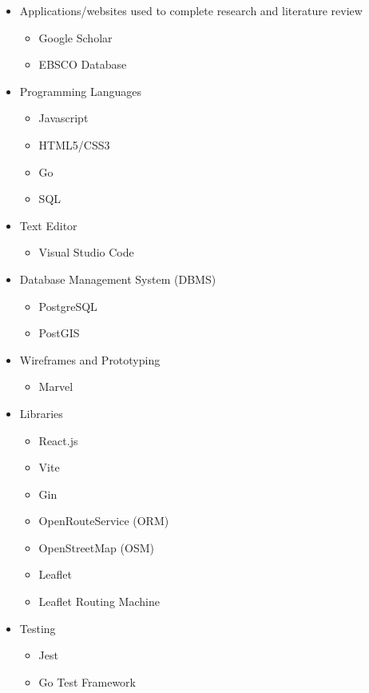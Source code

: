 \begin{itemize}
    \item Applications/websites used to complete research and literature review
    \begin{itemize}
        \item Google Scholar
        \item EBSCO Database
    \end{itemize}
    \item Programming Languages
    \begin{itemize}
        \item Javascript
        \item HTML5/CSS3
        \item Go
        \item SQL
    \end{itemize}
    \item Text Editor
    \begin{itemize}
        \item Visual Studio Code
    \end{itemize}
    \item Database Management System (DBMS)
    \begin{itemize}
        \item PostgreSQL
        \item PostGIS
    \end{itemize}
    \item Wireframes and Prototyping
    \begin{itemize}
        \item Marvel
    \end{itemize}
    \item Libraries
    \begin{itemize}
        \item React.js
        \item Vite
        \item Gin
        \item OpenRouteService (ORM)
        \item OpenStreetMap (OSM)
        \item Leaflet
        \item Leaflet Routing Machine
    \end{itemize}
    \item Testing
    \begin{itemize}
        \item Jest
        \item Go Test Framework

\end{itemize}
\end{itemize}
